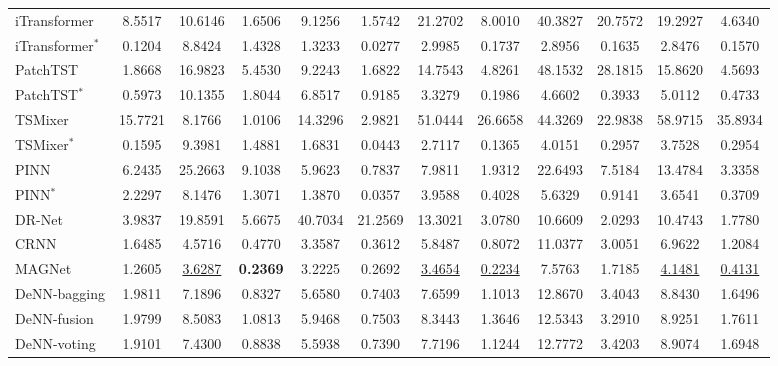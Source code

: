 \documentclass[lettersize,onecolumn]{IEEEtran}
\begin{document}
\begin{table}[htbp]
{\begin{threeparttable}
\begin{tabular}{lccccccccccc}
    \midrule
    iTransformer \cite{liu2024itransformer} & 8.5517  & 10.6146  & 1.6506  & 9.1256  & 1.5742  & 21.2702  & 8.0010  & 40.3827  & 20.7572  & 19.2927  & 4.6340  \\
    iTransformer$^\ast$ \cite{liu2024itransformer} & 0.1204  & 8.8424  & 1.4328  & 1.3233  & 0.0277  & 2.9985  & 0.1737  & 2.8956  & 0.1635  & 2.8476  & 0.1570  \\
    PatchTST \cite{nie2023a} & 1.8668  & 16.9823  & 5.4530  & 9.2243  & 1.6822  & 14.7543  & 4.8261  & 48.1532  & 28.1815  & 15.8620  & 4.5693  \\
    PatchTST$^\ast$ \cite{nie2023a} & 0.5973  & 10.1355  & 1.8044  & 6.8517  & 0.9185  & 3.3279  & 0.1986  & 4.6602  & 0.3933  & 5.0112  & 0.4733  \\
    TSMixer \cite{chen2023tsmixer} & 15.7721  & 8.1766  & 1.0106  & 14.3296  & 2.9821  & 51.0444  & 26.6658  & 44.3269  & 22.9838  & 58.9715  & 35.8934  \\
    TSMixer$^\ast$ \cite{chen2023tsmixer} & 0.1595  & 9.3981  & 1.4881  & 1.6831  & 0.0443  & 2.7117  & 0.1365  & 4.0151  & 0.2957  & 3.7528  & 0.2954  \\
    PINN \cite{wang2024physics}  & 6.2435  & 25.2663  & 9.1038  & 5.9623  & 0.7837  & 7.9811  & 1.9312  & 22.6493  & 7.5184  & 13.4784  & 3.3358  \\
    PINN$^\ast$ \cite{wang2024physics} & 2.2297  & 8.1476  & 1.3071  & 1.3870  & 0.0357  & 3.9588  & 0.4028  & 5.6329  & 0.9141  & 3.6541  & 0.3709  \\
    DR-Net \cite{WANG2023108897} & 3.9837  & 19.8591  & 5.6675  & 40.7034  & 21.2569  & 13.3021  & 3.0780  & 10.6609  & 2.0293  & 10.4743  & 1.7780  \\
    CRNN \cite{D2EE01676A}  & 1.6485  & 4.5716  & 0.4770  & 3.3587  & 0.3612  & 5.8487  & 0.8072  & 11.0377  & 3.0051  & 6.9622  & 1.2084  \\
    MAGNet \cite{TAN2024103725} & 1.2605  & \underline{3.6287}  & \textbf{0.2369} & 3.2225  & 0.2692  & \underline{3.4654}  & \underline{0.2234}  & 7.5763  & 1.7185  & \underline{4.1481}  & \underline{0.4131}  \\
    DeNN-bagging \cite{10102497} & 1.9811  & 7.1896  & 0.8327  & 5.6580  & 0.7403  & 7.6599  & 1.1013  & 12.8670  & 3.4043  & 8.8430  & 1.6496  \\
    DeNN-fusion \cite{10102497} & 1.9799  & 8.5083  & 1.0813  & 5.9468  & 0.7503  & 8.3443  & 1.3646  & 12.5343  & 3.2910  & 8.9251  & 1.7611  \\
    DeNN-voting \cite{10102497} & 1.9101  & 7.4300  & 0.8838  & 5.5938  & 0.7390  & 7.7196  & 1.1244  & 12.7772  & 3.4203  & 8.9074  & 1.6948  \\

\end{tabular}
\end{threeparttable}}
\end{table}
\end{document}
